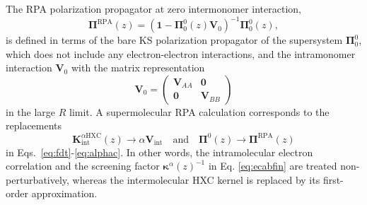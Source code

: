\documentclass[journal=jctcce,manuscript=article]{achemso}
\begin{document}
The RPA polarization propagator
at zero intermonomer interaction,
\begin{equation}
  \label{eq:pirpa}
  \boldsymbol{\Pi}^\text{RPA}(z) = \left( \mathbf{1}-
    \boldsymbol{\Pi}^0_0(z) \mathbf{V}_0 \right)^{-1}
  \boldsymbol{\Pi}^0_0(z),
\end{equation}
is defined in terms of the bare KS 
polarization propagator of the supersystem $\boldsymbol{\Pi}^0_0$,
which does not include any electron-electron interactions, and the 
intramonomer interaction $\mathbf{V}_0$ with the matrix
representation
\begin{equation}
  \mathbf{V}_0 = \begin{pmatrix}
    \mathbf{V}_{AA} & \mathbf{0}\\
     \mathbf{0} & \mathbf{V}_{BB} \end{pmatrix}
\end{equation}
in the large $R$ limit. A supermolecular RPA calculation corresponds to the
replacements
\begin{equation}
  \label{eq:rparep}
\mathbf{K}^{\alpha\text{HXC}}_\text{int}(z)
\rightarrow \alpha \mathbf{V}_{\text{int}}\quad \text{and} \quad
\boldsymbol{\Pi}^0(z) 
\rightarrow \boldsymbol{\Pi}^\text{RPA}(z)
\end{equation}
in Eqs.~\eqref{eq:fdt}-\eqref{eq:alphac}. In other words, the
intramolecular electron correlation and the screening factor
$\boldsymbol{\kappa}^\alpha(z)^{-1}$ in Eq. \eqref{eq:ecabfin} are
treated non-perturbatively, whereas the intermolecular HXC kernel is
replaced by its first-order approximation.
\end{document}
